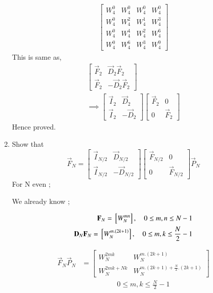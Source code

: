 \documentclass[journal,12pt,twocolumn]{IEEEtran}
\renewcommand\thesection{\arabic{section}}
\begin{document}
\begin{enumerate}[label=\arabic*.,ref=\thesection.\theenumi]
\begin{align}
\begin{bmatrix}
			W_4^0 &  W_4^0& W_4^0 & W_4^0 \\
			W_4^0 & W_4^2 & W_4^1 & W_4^3  \\
			W_4^0 & W_4^4 & W_4^2 &  W_4^6 \\
			W_4^0 & W_4^6 & W_4^3 & W_4^9       
		\end{bmatrix}
	\end{align} 
	This is same as,
	\begin{align}
		\begin{bmatrix}
			\vec{F}_{2} & \vec{D}_{2}\vec{F}_{2} \\
			\vec{F}_{2} & -\vec{D}_{2}\vec{F}_{2}
		\end{bmatrix}\\
		\implies \begin{bmatrix}
			\vec{I}_{2} & \vec{D}_{2} \\
			\vec{I}_{2} & -\vec{D}_{2}
		\end{bmatrix}
		\begin{bmatrix}
			\vec{F}_{2} & 0 \\
			0 & \vec{F}_{2}   
		\end{bmatrix}   
	\end{align} 
	Hence proved.
	
	\item Show that 
	\begin{equation}
		\vec{F}_{N}=
		\begin{bmatrix}
			\vec{I}_{N/2} & \vec{D}_{N/2} \\
			\vec{I}_{N/2} & -\vec{D}_{N/2}
		\end{bmatrix}
		\begin{bmatrix}
			\vec{F}_{N/2} & 0 \\
			0 & \vec{F}_{N/2}
		\end{bmatrix}
		\vec{P}_{N}
	\end{equation}
\solution
For N even ;

We already know ;

\begin{align}
	\mathbf{F}_{N} = {}\left[W_{N}^{mn}\right], \quad 0 \le m,n \le N-1  	\\
	\mathbf{D}_{N}\mathbf{F}_{N} = {}\left[W_{N}^{m.(2k+1)}\right], \quad 0 \le m,k \le \frac{N}{2}-1  	
\end{align}

\begin{align}
	\vec{F}_{N}\vec{P}_{N}&=\begin{bmatrix}
		{W_{N}^{2mk}}&{W_{N}^{m.(2k+1)}}\\ {W_{N}^{2mk+Nk}}&{W_{N}^{m.(2k+1)+\frac{N}{2}.(2k+1)}}
	\end{bmatrix}  \nonumber \\
   &\quad \quad \quad \quad \quad 0 \le m,k \le \frac{N}{2}-1  \nonumber 	
\end{align}


\end{enumerate}
\end{document}
